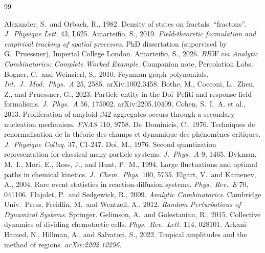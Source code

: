 \documentclass[11pt,a4paper]{article}
\theoremstyle{plain}
\begin{document}
\begin{thebibliography}{99}

 Alexander, S.\ and Orbach, R., 1982. Density of states on fractals: ``fractons''. \textit{J.\ Physique Lett.} 43, L625.
 Amarteifio, S., 2019. \textit{Field-theoretic formulation and empirical tracking of spatial processes}. PhD dissertation (supervised by G.~Pruessner), Imperial College London.
 Amarteifio, S., 2026. \textit{BRW via Analytic Combinatorics: Complete Worked Example}. Companion note, Percolation Labs.
 Bogner, C.\ and Weinzierl, S., 2010. Feynman graph polynomials. \textit{Int.\ J.\ Mod.\ Phys.\ A} 25, 2585. arXiv:1002.3458.
 Bothe, M., Cocconi, L., Zhen, Z., and Pruessner, G., 2023. Particle entity in the Doi--Peliti and response field formalisms. \textit{J.\ Phys.\ A} 56, 175002. arXiv:2205.10409.
 Cohen, S.~I.~A. et al., 2013. Proliferation of amyloid-$\beta$42 aggregates occurs through a secondary nucleation mechanism. \textit{PNAS} 110, 9758.
 De~Dominicis, C., 1976. Techniques de renormalisation de la th\'eorie des champs et dynamique des ph\'enom\`enes critiques. \textit{J.\ Physique Colloq.} 37, C1-247.
 Doi, M., 1976. Second quantization representation for classical many-particle systems. \textit{J.\ Phys.\ A} 9, 1465.
 Dykman, M.~I., Mori, E., Ross, J., and Hunt, P.~M., 1994. Large fluctuations and optimal paths in chemical kinetics. \textit{J.\ Chem.\ Phys.} 100, 5735.
 Elgart, V.\ and Kamenev, A., 2004. Rare event statistics in reaction-diffusion systems. \textit{Phys.\ Rev.\ E} 70, 041106.
 Flajolet, P.\ and Sedgewick, R., 2009. \textit{Analytic Combinatorics}. Cambridge Univ.\ Press.
 Freidlin, M.\ and Wentzell, A., 2012. \textit{Random Perturbations of Dynamical Systems}. Springer.
 Gelimson, A.\ and Golestanian, R., 2015. Collective dynamics of dividing chemotactic cells. \textit{Phys.\ Rev.\ Lett.} 114, 028101.
 Arkani-Hamed, N., Hillman, A., and Salvatori, S., 2022. Tropical amplitudes and the method of regions. \textit{arXiv:2202.12296}.


\end{thebibliography}
\end{document}
